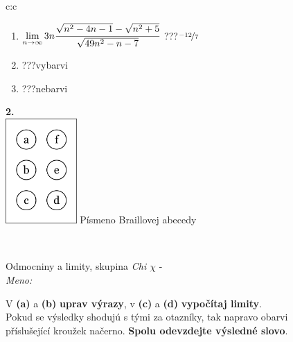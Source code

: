 \documentclass[10pt]{report}
\begin{document}
\begin{tabular}{c:c}
\begin{minipage}[c][104.5mm][t]{0.5\linewidth}
\begin{center}
\begin{minipage}{0.79\linewidth}
\begin{center}
\begin{varwidth}{\linewidth}
\begin{enumerate}
\item $\lim\limits_{n\to\infty}3n\cfrac{\sqrt{n^2-4n-1}-\sqrt{n^2+5}}{\sqrt{49n^2-n-7}}$\quad \dotfill\; ???\;\dotfill \quad $\nicefrac{-12}{7}$
\item \quad \dotfill\; ???\;\dotfill \quad vybarvi
\item \quad \dotfill\; ???\;\dotfill \quad nebarvi
\end{enumerate}
\end{varwidth}
\end{center}
\end{minipage}
\begin{minipage}{0.20\linewidth}
\begin{center}
{\Huge\bfseries 2.} \\[2mm]
\includegraphics[height=40mm]{../images/braille.png}
{\small Písmeno Braillovej abecedy}
\end{center}
\end{minipage}
\end{center}
\end{minipage}
\\ \hdashline
\begin{minipage}[c][104.5mm][t]{0.5\linewidth}
\begin{center}
\vspace{7mm}
{\huge Odmocniny a limity, skupina \textit{Chi $\chi$} -}\\[5mm]
\textit{Meno:}\phantom{xxxxxxxxxxxxxxxxxxxxxxxxxxxxxxxxxxxxxxxxxxxxxxxxxxxxxxxxxxxxxxxxx}\\[5mm]
\begin{minipage}{0.95\linewidth}
\begin{center}
V \textbf{(a)} a \textbf{(b)} \textbf{uprav výrazy}, v \textbf{(c)} a \textbf{(d)} \textbf{vypočítaj limity}.\\Pokud se výsledky shodujú s tými za otazníky, tak napravo obarvi\\příslušející kroužek načerno. \textbf{Spolu odevzdejte výsledné slovo}.
\end{center}
\end{minipage}
\\[1mm]

\end{center}
\end{minipage}
\end{tabular}
\end{document}
